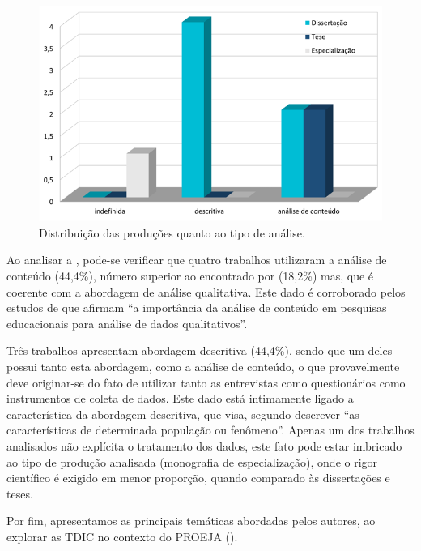 \begin{figure}[!htpb]
\centering
\begin{minipage}{.75\textwidth}
\caption{Distribuição das produções quanto ao tipo de análise.}\label{fig6}
\includegraphics[width=\textwidth]{Fig6.png}
\end{minipage}
\end{figure}

Ao analisar a , pode-se verificar que quatro trabalhos
utilizaram a análise de conteúdo (44,4\%), número superior ao encontrado
por \textcite{minuzzi2020} (18,2\%) mas, que é coerente com a
abordagem de análise qualitativa. Este dado é corroborado pelos estudos
de \textcite[p.~14]{Palmeira2020} que afirmam ``a importância
da análise de conteúdo em pesquisas educacionais para análise de dados
qualitativos''.

Três trabalhos apresentam abordagem descritiva (44,4\%), sendo que um
deles possui tanto esta abordagem, como a análise de conteúdo, o que
provavelmente deve originar-se do fato de utilizar tanto as entrevistas
como questionários como instrumentos de coleta de dados. Este dado está
intimamente ligado a característica da abordagem descritiva, que visa,
segundo \textcite[p.~27]{Gil2010} descrever ``as características de determinada
população ou fenômeno''. Apenas um dos trabalhos analisados não
explícita o tratamento dos dados, este fato pode estar imbricado ao tipo
de produção analisada (monografia de especialização), onde o rigor
científico é exigido em menor proporção, quando comparado às
dissertações e teses.

Por fim, apresentamos as principais temáticas abordadas pelos autores,
ao explorar as TDIC no contexto do PROEJA ().

